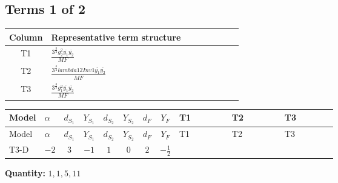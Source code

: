 \documentclass[8pt]{article}
\begin{document}
\begin{landscape}
\subsection*{Terms 1 of 2}
\begin{center}
\begin{tabular}{@{}c >{\raggedright\arraybackslash}p{0.82\linewidth}@{}}
\toprule
Column & Representative term structure \\
\midrule
T1 & \(\displaystyle \frac{3^{\frac{3}{4}} g_{2}^{2} \overline{y_{1}} \overline{y_{2}}}{MF}\) \\
\midrule
T2 & \(\displaystyle \frac{3^{\frac{3}{4}} lambda12Inv1 \overline{y_{1}} \overline{y_{2}}}{MF}\) \\
\midrule
T3 & \(\displaystyle \frac{3^{\frac{3}{4}} g_{1}^{2} \overline{y_{1}} \overline{y_{2}}}{MF}\) \\
\midrule
\bottomrule
\end{tabular}
\end{center}
\smallskip
\tiny
\begin{longtable}{@{}llcccccc >{\raggedright\arraybackslash}p{0.21\linewidth} >{\raggedright\arraybackslash}p{0.21\linewidth} >{\raggedright\arraybackslash}p{0.21\linewidth}@{}}
\toprule
Model & $\alpha$ & $d_{S_1}$ & $Y_{S_1}$ & $d_{S_2}$ & $Y_{S_2}$ & $d_F$ & $Y_F$ & T1 & T2 & T3 \\
\midrule
\endfirsthead
\toprule
Model & $\alpha$ & $d_{S_1}$ & $Y_{S_1}$ & $d_{S_2}$ & $Y_{S_2}$ & $d_F$ & $Y_F$ & T1 & T2 & T3 \\
\midrule
\endhead
T3-D & $-2$ & $3$ & $-1$ & $1$ & $0$ & $2$ & $-\frac{1}{2}$ & \scriptsize\adjustbox{max width=\linewidth}{$\begin{gathered} - \frac{17 \cdot 3^{\frac{3}{4}} g_{2}^{2} \overline{y_{1}} \overline{y_{2}}}{24 MF}\end{gathered}$} & \scriptsize\adjustbox{max width=\linewidth}{$\begin{gathered} - \frac{3^{\frac{3}{4}} lambda12Inv1 \overline{y_{1}} \overline{y_{2}}}{6 MF}\end{gathered}$} & \scriptsize\adjustbox{max width=\linewidth}{$\begin{gathered} - \frac{3^{\frac{3}{4}} g_{1}^{2} \overline{y_{1}} \overline{y_{2}}}{8 MF}\end{gathered}$} \\
\midrule
\bottomrule
\end{longtable}
\clearpage
\noindent\textbf{Quantity: }$\mathrm{1,1,5,11}$\par\smallskip

\end{landscape}
\end{document}
